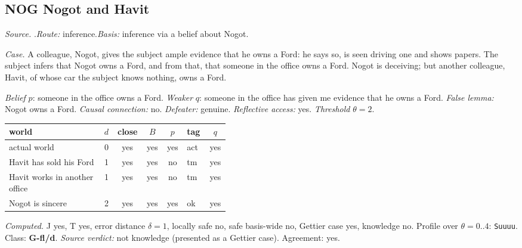 \subsection*{NOG \enspace Nogot and Havit}
\noindent\textit{Source.} \citet{Lehrer1965}.\quad \textit{Route:} inference.\quad \textit{Basis:} inference via a belief about Nogot.\par
\noindent\textit{Case.} A colleague, Nogot, gives the subject ample evidence that he owns a Ford: he says so, is seen driving one and shows papers. The subject infers that Nogot owns a Ford, and from that, that someone in the office owns a Ford. Nogot is deceiving; but another colleague, Havit, of whose car the subject knows nothing, owns a Ford.\par
\noindent\textit{Belief} $p$: someone in the office owns a Ford.
 \textit{Weaker} $q$: someone in the office has given me evidence that he owns a Ford.
 \textit{False lemma:} Nogot owns a Ford. \textit{Causal connection:} no. \textit{Defeater:} genuine. \textit{Reflective access:} yes. \textit{Threshold} $\theta = 2$.\par
\begin{center}\begin{tabular}{@{}p{0.43\linewidth}rccclc@{}}
world & $d$ & close & $B$ & $p$ & tag & $q$ \\ \midrule
actual world & 0 & yes & yes & yes & act & yes \\
Havit has sold his Ford & 1 & yes & yes & no & tm & yes \\
Havit works in another office & 1 & yes & yes & no & tm & yes \\
Nogot is sincere & 2 & yes & yes & yes & ok & yes \\
\end{tabular}\end{center}
\noindent\textit{Computed.} J yes, T yes, error distance $\delta = 1$, locally safe no, safe basis-wide no, Gettier case yes, knowledge no. Profile over $\theta = 0..4$: \texttt{Suuuu}. Class: \textbf{G-fl/d}.
 \textit{Source verdict:} not knowledge (presented as a Gettier case). Agreement: yes.
\par\medskip
{}

